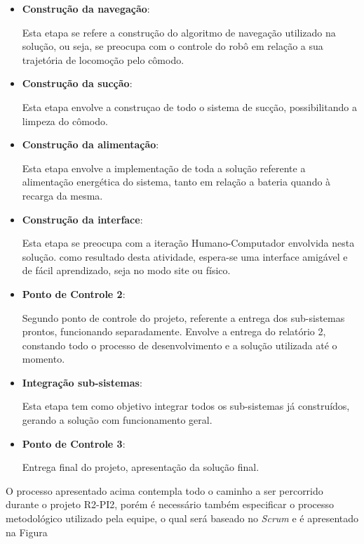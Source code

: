 \begin{itemize}
		\item \textbf{Construção da navegação}:

			Esta etapa se refere a construção do algoritmo de navegação utilizado na solução, ou seja, se preocupa com o controle do robô em relação a sua trajetória de locomoção pelo cômodo.

		\item \textbf{Construção da sucção}:

			Esta etapa envolve a construçao de todo o sistema de sucção, possibilitando a limpeza do cômodo.

		\item \textbf{Construção da alimentação}:

			Esta etapa envolve a implementação de toda a solução referente a alimentação energética do sistema, tanto em relação a bateria quando à recarga da mesma.

		\item \textbf{Construção da interface}:

			Esta etapa se preocupa com a iteração Humano-Computador envolvida nesta solução. como resultado desta atividade, espera-se uma interface amigável e de fácil aprendizado, seja no modo site ou físico.

		\item \textbf{Ponto de Controle 2}:

			Segundo ponto de controle do projeto, referente a entrega dos sub-sistemas prontos, funcionando separadamente. Envolve a entrega do relatório 2, constando todo o processo de desenvolvimento e a solução utilizada até o momento.

		\item \textbf{Integração sub-sistemas}:

			Esta etapa tem como objetivo integrar todos os sub-sistemas já construídos, gerando a solução com funcionamento geral.

		\item \textbf{Ponto de Controle 3}:

			Entrega final do projeto, apresentação da solução final.
	\end{itemize}

	O processo apresentado acima contempla todo o caminho a ser percorrido durante o projeto R2-PI2, porém é necessário também especificar o processo metodológico utilizado pela equipe, o qual será baseado no \textit{Scrum} e é apresentado na Figura 


